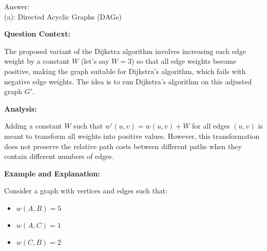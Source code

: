 \documentclass{oxmathproblems}
\begin{document}
\begin{questions}

Answer:\\
(a): Directed Acyclic Graphs (DAGs)

\textbf{Question Context:}

The proposed variant of the Dijkstra algorithm involves increasing each edge weight by a constant \( W \) (let's say \( W = 3 \)) so that all edge weights become positive, making the graph suitable for Dijkstra's algorithm, which fails with negative edge weights. The idea is to run Dijkstra's algorithm on this adjusted graph \( G' \).

\textbf{Analysis:}

Adding a constant \( W \) such that \( w'(u,v) = w(u,v) + W \) for all edges \( (u,v) \) is meant to transform all weights into positive values. However, this transformation does not preserve the relative path costs between different paths when they contain different numbers of edges.

\textbf{Example and Explanation:}

Consider a graph with vertices and edges such that:\begin{itemize}
    \item \( w(A, B) = 5 \)
    \item \( w(A, C) = 1 \)
    \item \( w(C, B) = 2 \)
    

\end{itemize}
\end{questions}
\end{document}
